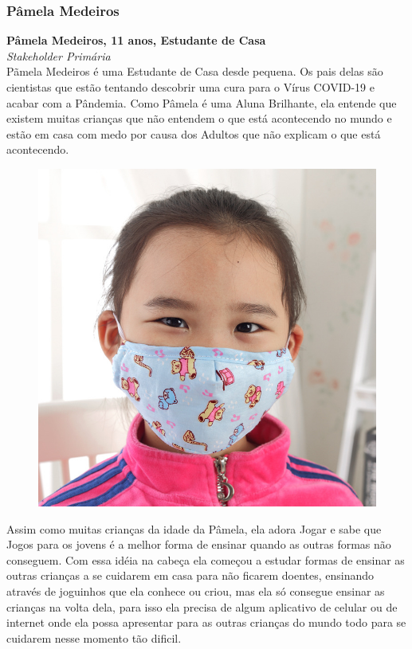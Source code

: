 \documentclass[12pt,brazil,a4paper]{article}
\begin{document}
\subsubsection{Pâmela Medeiros}
\textbf{Pâmela Medeiros, 11 anos, Estudante de Casa}\\
\textit{Stakeholder Primária}\\
Pãmela Medeiros é uma Estudante de Casa desde pequena. Os pais delas são cientistas que estão tentando
descobrir uma cura para o Vírus COVID-19 e acabar com a Pândemia.
Como Pâmela é uma Aluna Brilhante, ela entende que existem muitas crianças que não entendem o que está acontecendo no mundo
e estão em casa com medo por causa dos Adultos que não explicam o que está acontecendo.
\begin{figure}
\includegraphics[width=0.9\linewidth]{children_2.jpg}
\end{figure}
Assim como muitas crianças da idade da Pâmela, ela adora Jogar e sabe que Jogos para os jovens é a melhor forma de ensinar
quando as outras formas não conseguem. Com essa idéia na cabeça ela começou a estudar formas de ensinar as outras crianças
a se cuidarem em casa para não ficarem doentes, ensinando através de joguinhos que ela conhece ou criou, mas ela só
consegue ensinar as crianças na volta dela, para isso ela precisa de algum aplicativo de celular ou de internet onde
ela possa apresentar para as outras crianças do mundo todo para se cuidarem nesse momento tão dificil.
\end{document}
